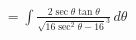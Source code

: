 \documentclass[preview]{standalone}
\begin{document}
\begin{align*}
&=\int \frac{2\sec\theta\tan\theta}{\sqrt{16\sec^2\theta-16}^3} \, d\theta \\
\end{align*}
\end{document}
